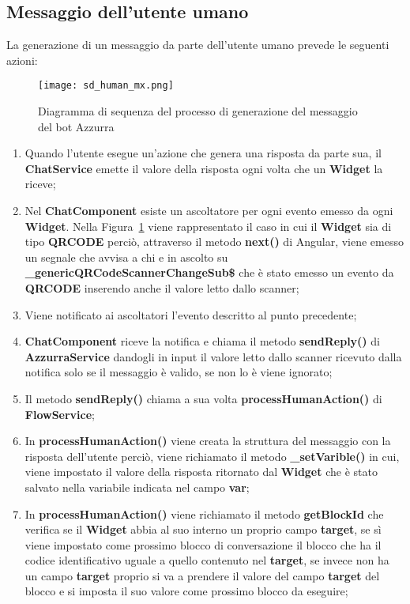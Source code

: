 \subsection{Messaggio dell’utente  umano}
La generazione di un messaggio da parte dell’utente umano prevede le seguenti azioni:\\
\begin{figure}[htbp]
	\centering
	\texttt{[image: sd\_human\_mx.png]}
	\caption{Diagramma di sequenza del processo di generazione del messaggio del bot Azzurra}\label{fig:mxHuman}
\end{figure}
\begin{enumerate}
	\item Quando l'utente esegue un'azione che genera una risposta da parte sua, il \textbf{ChatService} emette il valore della risposta ogni volta che un \textbf{Widget} la riceve;
	\item Nel \textbf{ChatComponent} esiste un ascoltatore per ogni evento emesso da ogni \textbf{Widget}. Nella Figura~\ref{fig:mxHuman} viene rappresentato il caso in cui il \textbf{Widget} sia di tipo \textbf{QRCODE} perciò, attraverso il metodo \textbf{next()} di Angular, viene emesso un segnale che avvisa a chi e in ascolto su  \textbf{\_genericQRCodeScannerChangeSub\$} che è stato emesso un evento da \textbf{QRCODE} inserendo anche il valore letto dallo scanner;
	\item Viene notificato ai ascoltatori l'evento descritto al punto precedente;
	\item \textbf{ChatComponent} riceve la notifica e chiama il metodo \textbf{sendReply()} di \textbf{AzzurraService} dandogli in input il valore letto dallo scanner ricevuto dalla notifica solo se il messaggio è valido, se non lo è viene ignorato;	
	\item Il metodo \textbf{sendReply()} chiama a sua volta \textbf{processHumanAction()} di \textbf{FlowService};
	\item In \textbf{processHumanAction()} viene creata la struttura del messaggio con la risposta dell'utente perciò, viene richiamato il metodo \textbf{\_setVarible()} in cui, viene impostato il valore della risposta ritornato dal \textbf{Widget} che è stato salvato nella variabile indicata nel campo \textbf{var};
	\item In \textbf{processHumanAction()} viene richiamato il metodo \textbf{getBlockId} che verifica se il \textbf{Widget} abbia al suo interno un proprio campo \textbf{target}, se sì viene impostato come prossimo blocco di conversazione il blocco che ha il codice identificativo uguale a quello contenuto nel \textbf{target}, se invece non ha un campo \textbf{target} proprio si va a prendere il valore del campo \textbf{target} del blocco e si imposta il suo valore come prossimo blocco da eseguire;

\end{enumerate}

